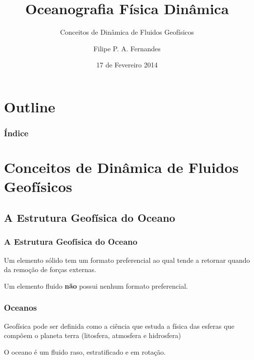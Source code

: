 \title[Aula 02]{Oceanografia Física Dinâmica}
\subtitle{Conceitos de Dinâmica de Fluidos Geofísicos}
\author[Filipe Fernandes]{Filipe P. A. Fernandes}
\date[Fevereiro 2014]{17 de Fevereiro 2014}




\begin{frame}[plain]
  \titlepage
\end{frame}

\section*{Outline}
\begin{frame}
\frametitle{Índice}
\tableofcontents
\end{frame}

\section{Conceitos de Dinâmica de Fluidos Geofísicos}
\subsection{A Estrutura Geofísica do Oceano}

\begin{frame}
\frametitle{A Estrutura Geofísica do Oceano}
  \begin{block}{}
    Um elemento sólido tem um formato preferencial ao qual tende a retornar
    quando da remoção de forças externas.
  \end{block}
\pause
  \begin{block}{}
    Um elemento fluido {\bf não} possui nenhum formato preferencial.
  \end{block}
\end{frame}

\begin{frame}
\frametitle{Oceanos}
  \begin{block}{}
    Geofísica pode ser definida como a ciência que estuda a física das
    esferas que compõem o planeta terra (litosfera, atmosfera e hidrosfera)
  \end{block}
\pause
  \begin{block}{}
    O oceano é um fluido raso, estratificado e em rotação.
  \end{block}
\end{frame}

